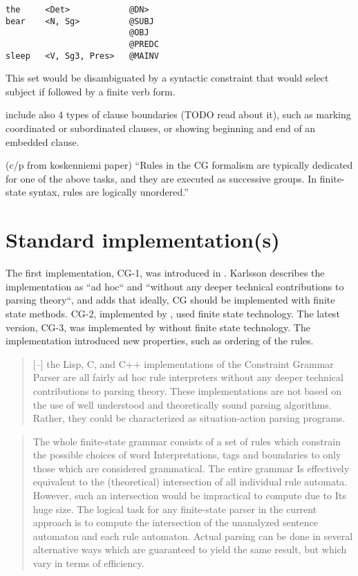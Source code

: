 \documentclass[a4paper, 11pt]{article}
\begin{document}
\begin{lstlisting}
the     <Det>            @DN>    
bear    <N, Sg>          @SUBJ
                         @OBJ
                         @PREDC
sleep   <V, Sg3, Pres>   @MAINV
\end{lstlisting}

This set would be disambiguated by a syntactic constraint that would
select subject if followed by a finite verb form.

\cite{koskenniemi92} include also 4 types of clause boundaries (TODO read about
it), such as marking coordinated or subordinated clauses, or showing
beginning and end of an embedded clause.

(c/p from koskenniemi paper)
``Rules in the CG formalism are typically dedicated
for one of the above tasks, and they are
executed as successive groups.
In finite-state syntax, rules are logically unordered.''




\section{Standard implementation(s)}

The first implementation, CG-1, was introduced in \cite{KarlssonTODO}. Karlsson describes the implementation as ``ad hoc`` and ``without any deeper technical contributions to parsing theory``, and adds that ideally, CG should be implemented with finite state methods.
CG-2, implemented by \cite{tapanainen1996}, used finite state technology. 
The latest version, CG-3, was implemented by \cite{TODO} without finite state technology. The implementation introduced new properties, such as ordering of the rules.

\begin{quote}
[--] the Lisp, C, and C++ implementations of the Constraint Grammar Parser are all fairly ad hoc rule interpreters without any deeper technical contributions to parsing theory. These implementations are not based on the use of well understood and theoretically sound parsing algorithms. Rather, they could be characterized as situation-action parsing programs. 
\end{quote}

\begin{quote}The whole finite-state grammar consists of a set of rules which
constrain the possible choices of word Interpretations, tags and
boundaries to only those which are considered grammatical. The entire grammar Is effectively equivalent to the (theoretical) intersection of all individual rule automata. However, such an intersection would be impractical to compute due to Its huge size.
The logical task for any finite-state parser in the current approach is
to compute the intersection of the unanalyzed sentence automaton and
each rule automaton. Actual parsing can be done in several alternative
ways which are guaranteed to yield the same result, but which vary in
terms of efficiency.
\end{quote}
\end{document}
